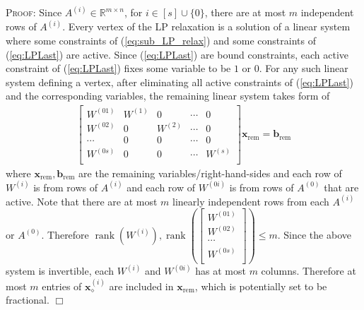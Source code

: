 \documentclass{article}
\newcommand{\R}{\mathbb{R}}
\DeclareMathOperator{\rank}{\operatorname{rank}}
\newcommand{\xv}[0]{\mathbf{x}}
\newcommand{\bv}[0]{\mathbf{b}}
\newenvironment{proof}[1][]
   {\textsc{Proof#1: }}
   {\hfill$\Box$\smallskip}
\begin{document}
\begin{proof}
Since $A^{(i)} \in \R^{m \times n}$,
for $i \in [s] \cup \{0\}$, there are at most $m$ independent rows of $A^{(i)}$. Every vertex of the LP relaxation is a solution of a linear system where some constraints of (\ref{eq:sub_LP_relax}) and some constraints of (\ref{eq:LPLast}) are active. Since (\ref{eq:LPLast}) are bound constraints, each active constraint of (\ref{eq:LPLast}) fixes some variable to be $1$ or $0$. For any such linear system defining a vertex,
after eliminating all active constraints of (\ref{eq:LPLast}) and the corresponding variables, the remaining linear system takes form of
\begin{align*}
    \begin{bmatrix}
        W^{(01)} & W^{(1)} & 0 & \cdots & 0 \\
        W^{(02)} & 0 & W^{(2)} & \cdots & 0 \\
        \cdots & 0 & 0 & \cdots & 0 \\
        W^{(0s)} & 0 & 0 & \cdots & W^{(s)} \\
    \end{bmatrix} \xv_{\text{rem}} = \bv_{\text{rem}}
\end{align*}
where $\xv_{\text{rem}},\bv_{\text{rem}}$ are the remaining variables/right-hand-sides and each row of  $W^{(i)}$ is from rows of $A^{(i)}$ and each row of $W^{(0i)}$ is from rows of $A^{(0)}$ that are active. Note that there are at most $m$ linearly independent rows from each $A^{(i)}$ or $A^{(0)}$. Therefore $\rank\left(W^{(i)}\right),\rank\left(  \begin{bmatrix}
        W^{(01)}  \\
        W^{(02)} \\
        \cdots \\
        W^{(0s)} \\
    \end{bmatrix} \right)\leq m$. Since the above system is invertible, each $W^{(i)}$ and  $W^{(0i)}$ has at most $m$ columns.
Therefore at most $m$ entries of $\xv_{\diamond}^{(i)}$ are included in $\xv_{\text{rem}}$, which is potentially set to be fractional.
\end{proof}

\end{document}
